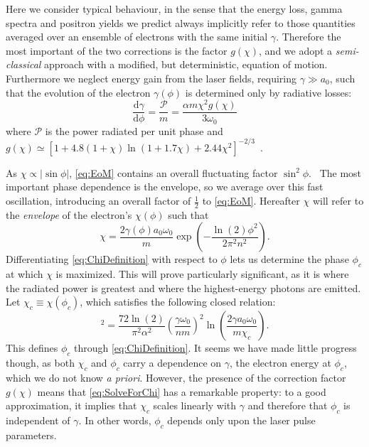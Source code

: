 \documentclass[reprint,superscriptaddress,amsmath,amssymb,aps,pra]{revtex4-1}
\newcommand{\rmd}{\mathrm{d}}
\newcommand{\lnTwo}{\ln(2)}
\newcommand{\Power}{\mathcal{P}}
\begin{document}
Here we consider typical behaviour, in the sense that the energy
loss, gamma spectra and positron yields we predict always implicitly refer to
those quantities averaged over an ensemble of electrons with the same
initial $\gamma$. Therefore the most important of the two corrections is
the factor $g(\chi)$, and we adopt a \emph{semi-classical} approach with
a modified, but deterministic, equation of motion. Furthermore we neglect
energy gain from the laser fields, requiring $\gamma \gg a_0$, such that
the evolution of the electron $\gamma(\phi)$ is determined only by radiative
losses:
	\begin{equation}
	\frac{\rmd \gamma}{\rmd \phi} = \frac{\Power}{m} =
		\frac{\alpha m \chi^2 g(\chi)}{3 \omega_0}
	\label{eq:EoM}
	\end{equation}
where $\Power$ is the power radiated per unit phase and
$g(\chi) \simeq [1+4.8(1+\chi)\ln(1+1.7\chi)+2.44\chi^2]^{-2/3}$~\cite{BKS}.

As $\chi \propto |\sin\phi|$, \cref{eq:EoM} contains an overall fluctuating factor
$\sin^2\phi$.\
The most important phase dependence is the envelope, so we average
over this fast oscillation, introducing an overall factor of $\tfrac{1}{2}$
to \cref{eq:EoM}. Hereafter $\chi$ will refer to the
\emph{envelope} of the electron's $\chi(\phi)$ such that
	\begin{equation}
	\chi =
		\frac{2 \gamma(\phi) a_0 \omega_0}{m}
		\exp\!\left( -\frac{\lnTwo \phi^2}{2 \pi^2 n^2} \right).
	\label{eq:ChiDefinition}
	\end{equation}
Differentiating \cref{eq:ChiDefinition} with respect to $\phi$ lets
us determine the phase $\phi_c$ at which $\chi$ is maximized.
This will prove particularly significant,
as it is where the radiated power is greatest and where the highest-energy
photons are emitted. Let $\chi_c \equiv \chi(\phi_c)$, which
satisfies the following closed relation:
	\begin{equation}
	[\chi_c^2 g(\chi_c)]^2 =
		\frac{72 \lnTwo}{\pi^2 \alpha^2}
		\left(\frac{\gamma \omega_0}{n m}\right)^2
		\ln\!\left( \frac{2 \gamma a_0 \omega_0}{m \chi_c} \right).
	\label{eq:SolveForChi}
	\end{equation}
This defines $\phi_c$ through \cref{eq:ChiDefinition}. It seems we have
made little progress though, as both $\chi_c$ and $\phi_c$ carry a dependence
on $\gamma$, the electron energy at $\phi_c$, which we do not know
\emph{a priori}. However, the presence of the correction factor $g(\chi)$
means that \cref{eq:SolveForChi} has a remarkable property: to a
good approximation, it implies that $\chi_c$ scales linearly with $\gamma$
and therefore that $\phi_c$ is independent of $\gamma$. In other words,
$\phi_c$ depends only upon the laser pulse parameters.
\end{document}
